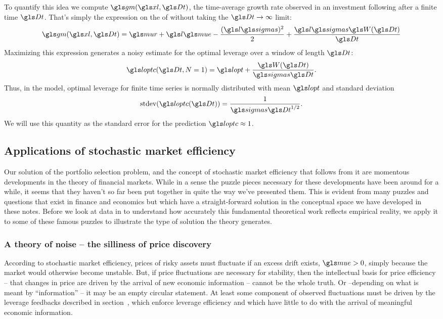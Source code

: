 To quantify this idea we compute $\gm(\xl,\Dt)$, \ie the time-average growth rate observed in an investment following  after a finite
time $\Dt$. That's simply the expression on the \RHS of  without taking the $\Dt\to\infty$ limit:
\begin{equation}
\gm(\xl,\Dt) =
\mur + \l\mue - \frac{(\l\sigmas)^2}{2} + \frac{\l\sigmas \gW(\Dt)}{\Dt}
%
\elabel{g_l_finite}
\end{equation}
Maximizing this expression generates a noisy estimate for the optimal leverage over a window of length $\Dt$:
\begin{equation}
\loptc(\Dt, N=1) = \lopt + \frac{\gW(\Dt)}{\sigmas \Dt}.
\end{equation}
Thus, in the model, optimal leverage for finite time series is
normally distributed with mean $\lopt$ and standard deviation
\begin{equation}
\text{stdev}(\loptc(\Dt)) = \frac{1}{\sigmas \Dt^{1/2}}.
\elabel{variance}
\end{equation}
We will use this quantity as the standard error for the prediction $\loptc\approx1$. 


\subsection{Applications of stochastic market efficiency}
Our solution of the portfolio selection problem, and the concept of stochastic market efficiency that follows from it are momentous developments in the theory of financial markets. While in a sense the puzzle pieces necessary for these developments have been around for a while, it seems that they haven't so far been put together in quite the way we've presented them. This is evident from many puzzles and questions that exist in finance and economics but which have a straight-forward solution in the conceptual space we have developed in these notes. Before we look at data in  to understand how accurately this fundamental theoretical work reflects empirical reality, we apply it to some of these famous puzzles to illustrate the type of solution the theory generates.

\subsubsection{A theory of noise -- the silliness of price discovery}
According to stochastic market efficiency, prices of risky assets must fluctuate if an excess drift exists, $\mue>0$, simply because the market would otherwise become unstable. But, if price fluctuations are necessary for stability, then the intellectual basis for price efficiency -- that changes in price are driven by the arrival of new economic information --  cannot be the whole truth. Or  --depending on what is meant by ``information'' -- it may be an empty circular statement. At least some component of observed fluctuations must be driven by the leverage feedbacks described in section~, which enforce leverage efficiency and which have little to do with the arrival of meaningful economic information.

